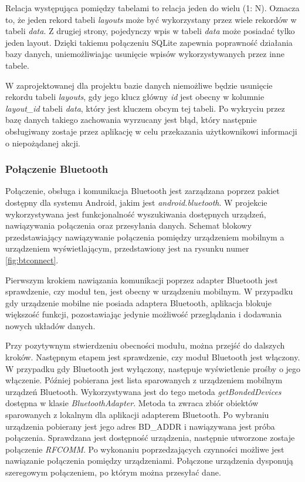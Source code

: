 \documentclass[a4paper,12pt, twoside]{article}
\begin{document}
        Relacja występująca pomiędzy tabelami to relacja jeden do wielu (1: N). Oznacza to, że jeden rekord tabeli \textit{layouts} może być wykorzystany przez wiele rekordów w tabeli \textit{data}. Z drugiej strony, pojedynczy wpis w tabeli \textit{data} może posiadać tylko jeden layout. Dzięki takiemu połączeniu SQLite zapewnia poprawność działania bazy danych, uniemożliwiając usunięcie wpisów wykorzystywanych przez inne tabele. 
        
        W zaprojektowanej dla projektu bazie danych niemożliwe będzie usunięcie rekordu tabeli \textit{layouts}, gdy jego klucz główny \textit{id} jest obecny w kolumnie \textit{layout\_id} tabeli \textit{data}, który jest kluczem obcym tej tabeli. Po wykryciu przez bazę danych takiego zachowania wyrzucany jest błąd, który następnie obsługiwany zostaje przez aplikację w celu przekazania użytkownikowi informacji o niepożądanej akcji.
    	
    	\subsubsection{Połączenie Bluetooth}
    	Połączenie, obsługa i komunikacja Bluetooth jest zarządzana poprzez pakiet dostępny dla systemu Android, jakim jest \textit{android.bluetooth}\cite{android.bluetooth}. W projekcie wykorzystywana jest funkcjonalność wyszukiwania dostępnych urządzeń, nawiązywania połączenia oraz przesyłania danych. Schemat blokowy przedstawiający nawiązywanie połączenia pomiędzy urządzeniem mobilnym a urządzeniem wyświetlającym, przedstawiony jest na rysunku numer \ref{fig:btconnect}. 
    	
    	Pierwszym krokiem nawiązania komunikacji poprzez adapter Bluetooth jest sprawdzenie, czy moduł ten, jest obecny w urządzeniu mobilnym. W przypadku gdy urządzenie mobilne nie posiada adaptera Bluetooth, aplikacja blokuje większość funkcji, pozostawiając jedynie możliwość przeglądania i dodawania nowych układów danych. 
    	
    	Przy pozytywnym stwierdzeniu obecności modułu, można przejść do dalszych kroków. Następnym etapem jest sprawdzenie, czy moduł Bluetooth jest włączony. W przypadku gdy Bluetooth jest wyłączony, następuje wyświetlenie prośby o jego włączenie. Później pobierana jest lista sparowanych z urządzeniem mobilnym urządzeń Bluetooth. Wykorzystywana jest do tego metoda \textit{getBondedDevices}\cite{bonded} dostępna w klasie \textit{BluetoothAdapter}. Metoda ta zwraca zbiór obiektów sparowanych z lokalnym dla aplikacji adapterem Bluetooth. Po wybraniu urządzenia pobierany jest jego adres BD\_ADDR i nawiązywana jest próba połączenia. Sprawdzana jest dostępność urządzenia, następnie utworzone zostaje połączenie \textit{RFCOMM}\cite{rfcomm}. Po wykonaniu poprzedzających czynności możliwe jest nawiązanie połączenia pomiędzy urządzeniami. Połączone urządzenia dysponują szeregowym połączeniem, po którym można przesyłać dane.
    	
\end{document}
